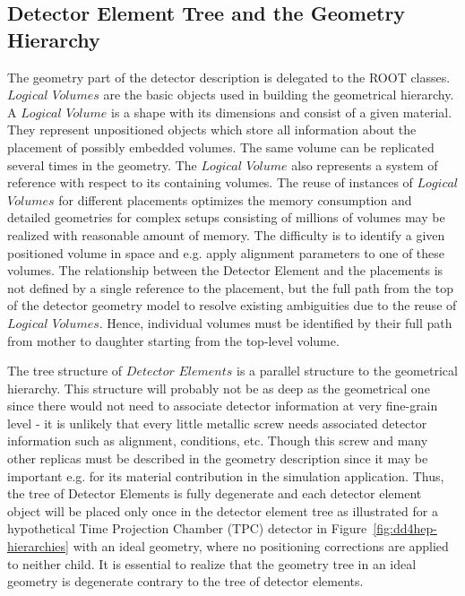 \documentclass[10pt,a4paper]{article}
\begin{document}
\subsection{Detector Element Tree and the Geometry Hierarchy}
\label{subsect:detelement-hierarchy}
\noindent
The geometry part of the detector description is delegated to the ROOT classes.
$Logical$ $Volumes$ are the basic objects used in building the geometrical hierarchy. 
A $Logical$ $Volume$ is a shape with its dimensions and consist of a given material. 
They represent unpositioned objects which store all information about 
the placement of possibly embedded volumes. The same
volume can be replicated several times in the geometry. The $Logical$ $Volume$ 
also represents a system of reference with respect to its containing volumes.
The reuse of instances of $Logical$ $Volumes$ for different placements 
optimizes the memory consumption and detailed geometries for complex setups
consisting of millions of volumes may be realized with reasonable amount of memory.
The difficulty is to identify a given positioned volume 
in space and e.g. apply alignment parameters to one of these volumes. 
The relationship between the Detector Element and the placements
is not defined by a single reference to the placement, but the full path 
from the top of the detector geometry model to resolve existing
ambiguities due to the reuse of $Logical$ $Volumes$.
Hence, individual volumes must be identified by their full path from mother 
to daughter starting from the top-level volume. 

\noindent
The tree structure of
$Detector$ $Elements$ is a parallel structure to the geometrical hierarchy.
This structure will probably not be as deep as the geometrical one since 
there would not need to associate detector information at very fine-grain 
level - it is unlikely that every little metallic screw
needs associated detector information such as alignment, conditions, etc.
Though this screw and many other replicas must be described in the geometry 
description since it may be important e.g. for its material contribution 
in the simulation application. Thus, the tree of Detector Elements is
fully degenerate and each detector element object will be placed only 
once in the detector element tree as illustrated for a hypothetical
Time Projection Chamber (TPC) detector in 
Figure~\ref{fig:dd4hep-hierarchies} with an ideal geometry,
where no positioning corrections are applied to neither child. 
It is essential to realize that the geometry tree in an ideal geometry is
degenerate contrary to the tree of detector elements.
\end{document}
